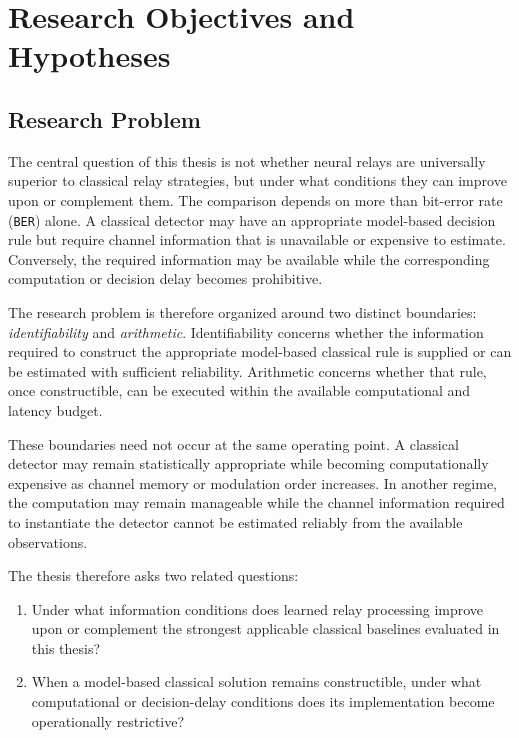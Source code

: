 \chapter{Research Objectives and Hypotheses}
\label{sec:research-objectives}

\section{Research Problem}
\label{sec:research-problem}

The central question of this thesis is not whether neural relays are
universally superior to classical relay strategies, but under what conditions
they can improve upon or complement them. The comparison depends on more than
bit-error rate (\texttt{BER}) alone. A classical detector may have an
appropriate model-based decision rule but require channel information that is
unavailable or expensive to estimate. Conversely, the required information
may be available while the corresponding computation or decision delay becomes
prohibitive.

The research problem is therefore organized around two distinct boundaries:
\emph{identifiability} and \emph{arithmetic}. Identifiability concerns whether
the information required to construct the appropriate model-based classical
rule is supplied or can be estimated with sufficient reliability. Arithmetic
concerns whether that rule, once constructible, can be executed within the
available computational and latency budget.

These boundaries need not occur at the same operating point. A classical
detector may remain statistically appropriate while becoming computationally
expensive as channel memory or modulation order increases. In another regime,
the computation may remain manageable while the channel information required
to instantiate the detector cannot be estimated reliably from the available
observations.

The thesis therefore asks two related questions:

\begin{enumerate}
    \item Under what information conditions does learned relay processing
    improve upon or complement the strongest applicable classical baselines
    evaluated in this thesis?

    \item When a model-based classical solution remains constructible, under
    what computational or decision-delay conditions does its implementation
    become operationally restrictive?
\end{enumerate}

